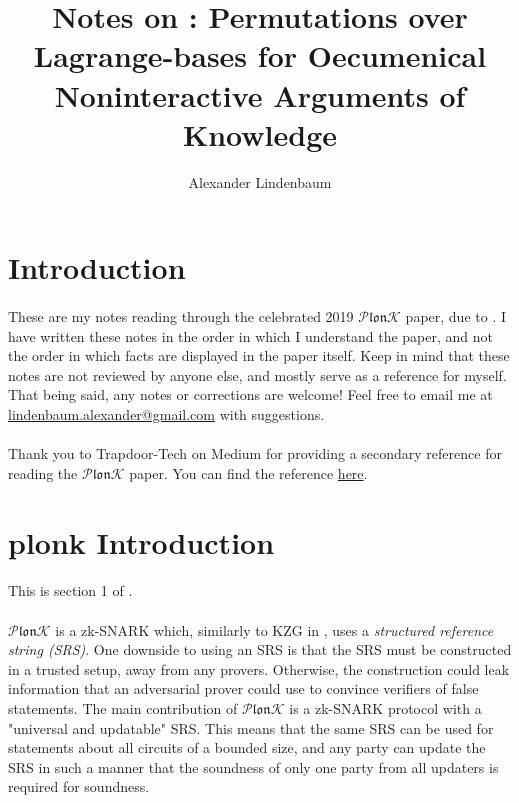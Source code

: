 \documentclass[11pt]{article}
\title{Notes on \plonk{}: Permutations over Lagrange-bases for Oecumenical Noninteractive Arguments of Knowledge}
\author{Alexander Lindenbaum}
\date{}
\newcommand{\plonk}{$\mathcal{P} \mathfrak{lon} \mathcal{K}$}
\begin{document}
\maketitle

\section{Introduction}

\paragraph{} These are my notes reading through the celebrated 2019 \plonk{} paper, due to \cite{plonk}. I have written these notes in the order in which I understand the paper, and not the order in which facts are displayed in the paper itself. Keep in mind that these notes are not reviewed by anyone else, and mostly serve as a reference for myself. That being said, any notes or corrections are welcome! Feel free to email me at \href{mailto:lindenbaum.alexander@gmail.com}{lindenbaum.alexander@gmail.com} with suggestions.

\paragraph{} Thank you to Trapdoor-Tech on Medium for providing a secondary reference for reading the \plonk{} paper. You can find the reference \href{https://trapdoortech.medium.com/zkp-plonk-algorithm-introduction-834556a32a}{here}.

\section{plonk Introduction}
\paragraph{} This is section 1 of \cite{plonk}.

\paragraph{} \plonk{} is a zk-SNARK which, similarly to KZG in \cite{kzg10}, uses a \textit{structured reference string (SRS)}. One downside to using an SRS is that the SRS must be constructed in a trusted setup, away from any provers. Otherwise, the construction could leak information that an adversarial prover could use to convince verifiers of false statements. The main contribution of \plonk{} is a zk-SNARK protocol with a "universal and updatable" SRS. This means that the same SRS can be used for statements about all circuits of a bounded size, and any party can update the SRS in such a manner that the soundness of only one party from all updaters is required for soundness.
\end{document}
